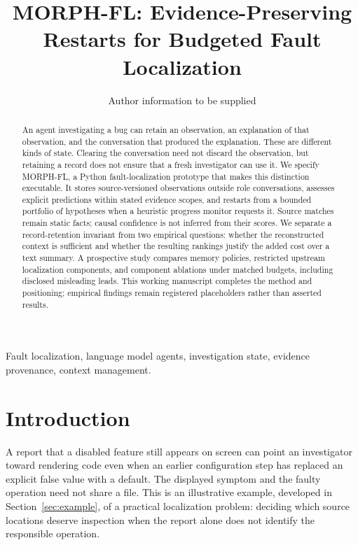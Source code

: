 \documentclass[letterpaper,journal]{IEEEtran}
\newcommand{\tool}{MORPH-FL}
\begin{document}
\title{MORPH-FL: Evidence-Preserving Restarts for Budgeted Fault Localization}
\author{Author information to be supplied}
\maketitle
\begin{abstract}
An agent investigating a bug can retain an observation, an explanation of that observation, and the conversation that produced the explanation. These are different kinds of state. Clearing the conversation need not discard the observation, but retaining a record does not ensure that a fresh investigator can use it. We specify \tool{}, a Python fault-localization prototype that makes this distinction executable. It stores source-versioned observations outside role conversations, assesses explicit predictions within stated evidence scopes, and restarts from a bounded portfolio of hypotheses when a heuristic progress monitor requests it. Source matches remain static facts; causal confidence is not inferred from their scores. We separate a record-retention invariant from two empirical questions: whether the reconstructed context is sufficient and whether the resulting rankings justify the added cost over a text summary. A prospective study compares memory policies, restricted upstream localization components, and component ablations under matched budgets, including disclosed misleading leads. This working manuscript completes the method and positioning; empirical findings remain registered placeholders rather than asserted results.
\end{abstract}
\begin{IEEEkeywords}
Fault localization, language model agents, investigation state, evidence provenance, context management.
\end{IEEEkeywords}

\section{Introduction}\label{sec:intro}
A report that a disabled feature still appears on screen can point an investigator toward rendering code even when an earlier configuration step has replaced an explicit false value with a default. The displayed symptom and the faulty operation need not share a file. This is an illustrative example, developed in Section~\ref{sec:example}, of a practical localization problem: deciding which source locations deserve inspection when the report alone does not identify the responsible operation.
\end{document}
